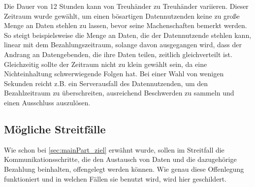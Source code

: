 \documentclass[
	fontsize=12pt,
	headings=small,
	parskip=half,           %
	bibliography=totoc,
	numbers=noenddot,       %
	open=any,               %
]{scrreprt}
\begin{document}
Die Dauer von 12 Stunden kann von Treuhänder zu Treuhänder variieren. Dieser Zeitraum wurde gewählt, um einen bösartigen Datennutzenden keine zu große Menge an Daten stehlen zu lassen, bevor seine Machenschaften bemerkt werden. So steigt beispielsweise die Menge an Daten, die der Datennutzende stehlen kann, linear mit dem Bezahlungszeitraum, solange davon ausgegangen wird, dass der Andrang an Datengebenden, die ihre Daten teilen, zeitlich gleichverteilt ist. Gleichzeitig sollte der Zeitraum nicht zu klein gewählt sein, da eine Nichteinhaltung schwerwiegende Folgen hat. Bei einer Wahl von wenigen Sekunden reicht z.B. ein Serverausfall des Datennutzenden, um den Bezahlzeitraum zu überschreiten, ausreichend Beschwerden zu sammeln und einen Ausschluss auszulösen.



\subsection{Mögliche Streitfälle}
\label{subsec:payStreit}
Wie schon bei \ref{sec:mainPart_ziel} erwähnt wurde, sollen im Streitfall die Kommunikationsschritte, die den Austausch von Daten und die dazugehörige Bezahlung beinhalten, offengelegt werden können. Wie genau diese Offenlegung funktioniert und in welchen Fällen sie benutzt wird, wird hier geschildert.\\
\end{document}
